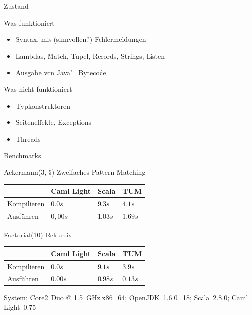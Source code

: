 \documentclass[hyperref={pdfpagelabels=false}]{beamer}
\begin{document}
\begin{frame}{Zustand}
  \begin{exampleblock}{Was funktioniert}
    \begin{itemize}
      \item Syntax, mit (sinnvollen?) Fehlermeldungen
      \item Lambdas, Match, Tupel, Records, Strings, Listen
      \item Ausgabe von Java"=Bytecode
    \end{itemize}
  \end{exampleblock}
  \begin{alertblock}{Was nicht funktioniert}
    \begin{itemize}
      \item Typkonstruktoren
      \item Seiteneffekte, Exceptions
      \item Threads
    \end{itemize}
  \end{alertblock}
\end{frame}

\begin{frame}{Benchmarks}
  \begin{block}{Ackermann(3, 5)}
    Zweifaches Pattern Matching

    \begin{tabular}{l|l|l|l}
       & Caml Light & Scala & TUM \\
      \hline
      Kompilieren & \textcolor{fastest}{$0.0s$} & \textcolor{slowest}{$9.3s$} & $4.1s$ \\
      Ausführen & \textcolor{fastest}{$0,00s$} & $1.03s$ & \textcolor{slowest}{$1.69s$} \\
    \end{tabular}
  \end{block}
  \begin{block}{Factorial(10)}
    Rekursiv

    \begin{tabular}{l|l|l|l}
       & Caml Light & Scala & TUM \\
      \hline
      Kompilieren & \textcolor{fastest}{$0.0s$} & \textcolor{slowest}{$9.1s$} & $3.9s$ \\
      Ausführen & \textcolor{fastest}{$0.00s$} & \textcolor{slowest}{$0.98s$} & $0.13s$ \\
    \end{tabular}
  \end{block}
  System: Core2~Duo @ 1.5~GHz x86\_64; OpenJDK~1.6.0\_18; Scala~2.8.0; Caml Light~0.75
\end{frame}
\end{document}
